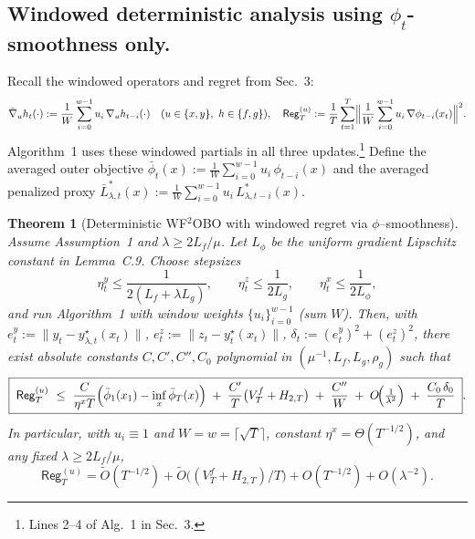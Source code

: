 \documentclass{uai2026} %
\newtheorem{theorem}{Theorem}[section]
\newcommand{\Reg}{\mathsf{Reg}}
\begin{document}
\subsection{Windowed deterministic analysis using $\phi_t$-smoothness only.}
Recall the windowed operators and regret from Sec.~3:
\[
\bar\nabla_u h_t(\cdot):=\frac{1}{W}\sum_{i=0}^{w-1}u_i\,\nabla_u h_{t-i}(\cdot)\quad(u\in\{x,y\},~h\in\{f,g\}),
\quad
\Reg^{(u)}_T:=\frac{1}{T}\sum_{t=1}^T\Bigl\|
\frac{1}{W}\sum_{i=0}^{w-1}u_i\,\nabla\phi_{t-i}(x_t)\Bigr\|^2.
\]
Algorithm~1 uses these windowed partials in all three updates.\footnote{Lines 2–4 of Alg.~1 in Sec.~3.} 
Define the averaged outer objective $\bar\phi_t(x):=\frac{1}{W}\sum_{i=0}^{w-1}u_i\,\phi_{t-i}(x)$ and the averaged penalized proxy 
$\bar L^{*}_{\lambda,t}(x):=\frac{1}{W}\sum_{i=0}^{w-1}u_i\,L^{*}_{\lambda,t-i}(x)$. 

\begin{theorem}[Deterministic WF$^2$OBO with windowed regret via $\phi$–smoothness]
\label{thm:det-window-phi}
Assume Assumption~1 and $\lambda\ge 2L_f/\mu$. Let $L_\phi$ be the uniform gradient Lipschitz constant in Lemma~C.9. Choose stepsizes
\[
\eta^y_t\le \frac{1}{2(L_f+\lambda L_g)},\qquad 
\eta^z_t\le \frac{1}{2L_g},\qquad
\eta^x_t\le \frac{1}{2L_\phi},
\]
and run Algorithm~1 with window weights $\{u_i\}_{i=0}^{w-1}$ (sum $W$). Then, with $e^y_t:=\|y_t-y^\star_{\lambda,t}(x_t)\|$, $e^z_t:=\|z_t-y^\star_t(x_t)\|$, $\delta_t:=(e^y_t)^2+(e^z_t)^2$, there exist absolute constants $C,C',C'',C_0$ polynomial in $(\mu^{-1},L_f,L_g,\rho_g)$ such that
\[
\boxed{\;
\Reg^{(u)}_T\ \le\ 
\frac{C}{\eta^x T}\Bigl(\bar\phi_1(x_1)-\inf_x \bar\phi_T(x)\Bigr)
\;+\;\frac{C'}{T}\bigl(V_T^{f}+H_{2,T}\bigr)
\;+\;\frac{C''}{W}
\;+\;O\!\Bigl(\tfrac{1}{\lambda^2}\Bigr)
\;+\;\frac{C_0\,\delta_0}{T}\; }.
\]
In particular, with $u_i\equiv 1$ and $W=w=\lceil\sqrt{T}\rceil$, constant $\eta^x=\Theta(T^{-1/2})$, and any fixed $\lambda\ge 2L_f/\mu$, 
\[
\Reg^{(u)}_T=\tilde O(T^{-1/2})+\tilde O\bigl((V_T^{f}+H_{2,T})/T\bigr)+O(T^{-1/2})+O(\lambda^{-2}).
\]
\end{theorem}
\end{document}

